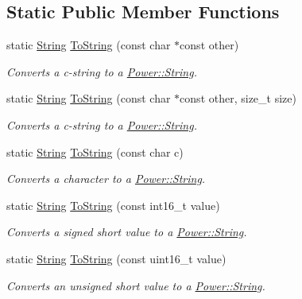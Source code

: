\subsection*{Static Public Member Functions}
\begin{DoxyCompactItemize}
\item 
static \hyperlink{class_power_1_1_string}{String} \hyperlink{class_power_1_1_string_a8c1588b3f0b9edb49f72ecb3f83e6d8f}{To\+String} (const char $\ast$const other)
\begin{DoxyCompactList}\small\item\em Converts a c-\/string to a \hyperlink{class_power_1_1_string}{Power\+::\+String}. \end{DoxyCompactList}\item 
static \hyperlink{class_power_1_1_string}{String} \hyperlink{class_power_1_1_string_a3d2d617ee6d215b8524253280d3d67f4}{To\+String} (const char $\ast$const other, size\+\_\+t size)
\begin{DoxyCompactList}\small\item\em Converts a c-\/string to a \hyperlink{class_power_1_1_string}{Power\+::\+String}. \end{DoxyCompactList}\item 
static \hyperlink{class_power_1_1_string}{String} \hyperlink{class_power_1_1_string_a0567cc940b3762eb82b1575b42cdb63a}{To\+String} (const char c)
\begin{DoxyCompactList}\small\item\em Converts a character to a \hyperlink{class_power_1_1_string}{Power\+::\+String}. \end{DoxyCompactList}\item 
static \hyperlink{class_power_1_1_string}{String} \hyperlink{class_power_1_1_string_ad2fb9ef1c261109181bfdbe07a99e774}{To\+String} (const int16\+\_\+t value)
\begin{DoxyCompactList}\small\item\em Converts a signed short value to a \hyperlink{class_power_1_1_string}{Power\+::\+String}. \end{DoxyCompactList}\item 
static \hyperlink{class_power_1_1_string}{String} \hyperlink{class_power_1_1_string_a772fcd39002ebfc3bae0a96691bb5d57}{To\+String} (const uint16\+\_\+t value)
\begin{DoxyCompactList}\small\item\em Converts an unsigned short value to a \hyperlink{class_power_1_1_string}{Power\+::\+String}. \end{DoxyCompactList}\item 

\end{DoxyCompactItemize}
